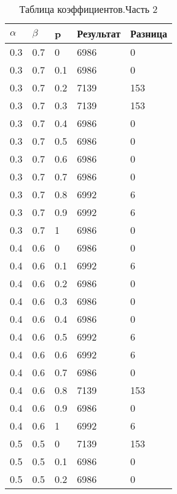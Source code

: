 \begin{table}[ht]
	\centering
	\caption{Таблица коэффициентов.Часть 2}
	\label{table:ref2}
	\begin{tabular}{ | l | l | l | l | l |}
		\hline
		$\alpha$ & $\beta$ & p   & Результат & Разница \\
		\hline
		0.3      & 0.7     & 0   & 6986      & 0       \\
		0.3      & 0.7     & 0.1 & 6986      & 0       \\
		0.3      & 0.7     & 0.2 & 7139      & 153     \\
		0.3      & 0.7     & 0.3 & 7139      & 153     \\
		0.3      & 0.7     & 0.4 & 6986      & 0       \\
		0.3      & 0.7     & 0.5 & 6986      & 0       \\
		0.3      & 0.7     & 0.6 & 6986      & 0       \\
		0.3      & 0.7     & 0.7 & 6986      & 0       \\
		0.3      & 0.7     & 0.8 & 6992      & 6       \\
		0.3      & 0.7     & 0.9 & 6992      & 6       \\
		0.3      & 0.7     & 1   & 6986      & 0       \\
		0.4      & 0.6     & 0   & 6986      & 0       \\
		0.4      & 0.6     & 0.1 & 6992      & 6       \\
		0.4      & 0.6     & 0.2 & 6986      & 0       \\
		0.4      & 0.6     & 0.3 & 6986      & 0       \\
		0.4      & 0.6     & 0.4 & 6986      & 0       \\
		0.4      & 0.6     & 0.5 & 6992      & 6       \\
		0.4      & 0.6     & 0.6 & 6992      & 6       \\
		0.4      & 0.6     & 0.7 & 6986      & 0       \\
		0.4      & 0.6     & 0.8 & 7139      & 153     \\
		0.4      & 0.6     & 0.9 & 6986      & 0       \\
		0.4      & 0.6     & 1   & 6992      & 6       \\
		0.5      & 0.5     & 0   & 7139      & 153     \\
		0.5      & 0.5     & 0.1 & 6986      & 0       \\
		0.5      & 0.5     & 0.2 & 6986      & 0       \\

\end{tabular}
\end{table}
